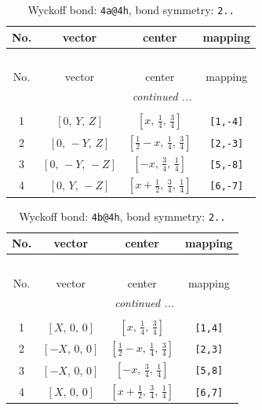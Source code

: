 \documentclass[fleqn,8pt]{jsarticle}
\begin{document}
\begin{longtable}{cccc}
\caption{Wyckoff bond: {\tt 4a@4h}, bond symmetry: {\tt 2..}}
 \\
 \hline \hline
No. & vector & center & mapping \\ \hline \endfirsthead

\multicolumn{3}{l}{\tablename\ \thetable{}} \\
 \hline \hline
No. & vector & center & mapping \\ \hline \endhead

 \hline \hline
\multicolumn{3}{r}{\footnotesize\it continued ...} \\ \endfoot

 \hline \hline
\multicolumn{3}{r}{} \\ \endlastfoot

1 & $\left[ 0,\, Y,\, Z \right]$ & $\left[ x,\, \frac{1}{4},\, \frac{3}{4} \right]$ & {\tt [1,-4]} \\ \hline
2 & $\left[ 0,\, - Y,\, Z \right]$ & $\left[ \frac{1}{2} - x,\, \frac{1}{4},\, \frac{3}{4} \right]$ & {\tt [2,-3]} \\ \hline
3 & $\left[ 0,\, - Y,\, - Z \right]$ & $\left[ - x,\, \frac{3}{4},\, \frac{1}{4} \right]$ & {\tt [5,-8]} \\ \hline
4 & $\left[ 0,\, Y,\, - Z \right]$ & $\left[ x + \frac{1}{2},\, \frac{3}{4},\, \frac{1}{4} \right]$ & {\tt [6,-7]} \\
\end{longtable}
\renewcommand{\arraystretch}{1.2}
\begin{longtable}{cccc}
\caption{Wyckoff bond: {\tt 4b@4h}, bond symmetry: {\tt 2..}}
 \\
 \hline \hline
No. & vector & center & mapping \\ \hline \endfirsthead

\multicolumn{3}{l}{\tablename\ \thetable{}} \\
 \hline \hline
No. & vector & center & mapping \\ \hline \endhead

 \hline \hline
\multicolumn{3}{r}{\footnotesize\it continued ...} \\ \endfoot

 \hline \hline
\multicolumn{3}{r}{} \\ \endlastfoot

1 & $\left[ X,\, 0,\, 0 \right]$ & $\left[ x,\, \frac{1}{4},\, \frac{3}{4} \right]$ & {\tt [1,4]} \\ \hline
2 & $\left[ - X,\, 0,\, 0 \right]$ & $\left[ \frac{1}{2} - x,\, \frac{1}{4},\, \frac{3}{4} \right]$ & {\tt [2,3]} \\ \hline
3 & $\left[ - X,\, 0,\, 0 \right]$ & $\left[ - x,\, \frac{3}{4},\, \frac{1}{4} \right]$ & {\tt [5,8]} \\ \hline
4 & $\left[ X,\, 0,\, 0 \right]$ & $\left[ x + \frac{1}{2},\, \frac{3}{4},\, \frac{1}{4} \right]$ & {\tt [6,7]} \\
\end{longtable}
\end{document}
